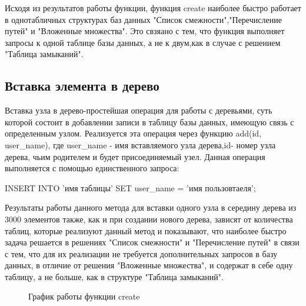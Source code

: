 \documentclass[a4paper,14pt]{extreport}
\theoremstyle{definition}
\begin{document}
Исходя из результатов работы функции, функция create наиболее быстро работает в однотабличных структурах баз данных "Список смежности","Перечисление путей" и "Вложенные множества". Это свзяано с тем, что функция выполняет запросы к одной таблице базы данных, а не к двум,как в случае с решением "Таблица замыканий".
\subsection{Вставка элемента в дерево}
Вставка узла в дерево-простейшая операция для работы с деревьями, суть которой состоит в добавлении записи в таблицу базы данных, имеющую связь с определенным узлом.
Реализуется эта операция через функцию add(\textdollar id, \textdollar user\_name), где \textdollar user\_name - имя вставляемого узла дерева,\textdollar id- номер узла дерева, чьим родителем и будет присоединяемый узел.
Данная операция выполняется с помощью единственного запроса:

INSERT INTO 'имя таблицы' SET  user\_name = 'имя пользовтаеля';

Результаты работы данного метода для вставки одного узла в середину дерева из 3000 элементов также, как и при создании нового дерева, зависят от количества таблиц, которые реализуют данный метод и показывают, что наиболее быстро задача решается в решениях "Список смежности" и "Перечисление путей" в связи с тем, что для их реализации не требуется дополнительных запросов в базу данных, в отличие от решения "Вложенные множества", и содержат в себе одну таблицу, а не больше, как в структуре "Таблица замыканий".

\begin{figure}
\caption{График работы функции create}
\label{fig:3}
\end{figure}
\end{document}
